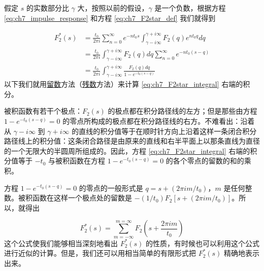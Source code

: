 假定 $s$ 的实数部分比 $\gamma$ 大，按照以前的假设，$\gamma$ 是一个负数，根据方程 \eqref{eq:ch7_impulse_response} 和方程 \eqref{eq:ch7_F2star_def} 我们就得到

\begin{equation}\label{eq:ch7_F2star_integral}
\begin{array}{ll}
F_2^*(s) &= \frac{t_0}{2\pi i} \sum_{n=0}^{\infty} e^{-nt_0 s} \int_{\gamma - i\infty}^{\gamma + i\infty} F_2(q)e^{nt_0 q} dq\\
&= \frac{t_0}{2\pi i} \int_{\gamma - i\infty}^{\gamma + i\infty} F_2(q)dq \sum_{n=0}^{\infty} e^{-nt_0 (s-q)}\\
&= \frac{t_0}{2\pi i} \int_{\gamma - i\infty}^{\gamma + i\infty} \frac{F_2(q)dq}{1-e^{-t_0 (s-q)}} 
\end{array}
\end{equation}
以下我们就用\underline{留数}方法（\underline{残数}方法）来计算 \eqref{eq:ch7_F2star_integral} 右端的积分。

被积函数有若干个极点：$F_2(s)$ 的极点都在积分路径线的左方；但是那些由方程 $1-e^{-t_0 (s-q)} = 0$ 的零点所构成的极点都在积分路径线的右方。不难看出：沿着从 $\gamma - i\infty$ 到 $\gamma + i\infty$ 的直线的积分值等于在顺时针方向上沿着这样一条闭合积分路径线上的积分值：这条闭合路径是由原来的直线和右半平面上以那条直线为直径的一个无限大的半圆周所组成的。因此，方程 \eqref{eq:ch7_F2star_integral} 右端的积分值等于 $-t_0$ 与被积函数在方程 $1-e^{-t_0 (s-q)} = 0$ 的各个零点的留数的和的乘积。

方程 $1-e^{-t_0 (s-q)} = 0$ 的零点的一般形式是 $q = s + (2\pi im/t_0)$，$m$ 是任何整数。被积函数在这样一个极点处的留数是 $-(1/t_0) F_2[s + (2\pi im/t_0)]$。所以，就得出

\begin{equation}\label{eq:ch7_F2star_series}
F_2^*(s) = \sum_{m=-\infty}^{m=\infty} F_2\left(s + \frac{2\pi im}{t_0}\right) 
\end{equation}
这个公式使我们能够相当深刻地看出 $F_2^*(s)$ 的性质，有时候也可以利用这个公式进行近似的计算。但是，我们还可以用相当简单的有限形式把 $F_2^*(s)$ 精确地表示出来。

